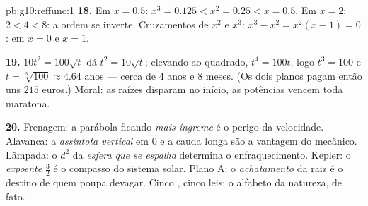 \begin{solution}{pb:g10:reffunc:1}
\textbf{18.} Em $x = 0.5$: $x^3 = 0.125 < x^2 = 0.25 < x =
0.5$. Em $x = 2$: $2 < 4 < 8$: a ordem se inverte. Cruzamentos
de $x^2$ e $x^3$: $x^3 - x^2 = x^2(x - 1) = 0$: em $x = 0$ e
$x = 1$.

\textbf{19.} $10t^2 = 100\sqrt t$ dá $t^2 = 10\sqrt t$;
elevando ao quadrado, $t^4 = 100t$, logo $t^3 = 100$ e
$t = \sqrt[3]{100} \approx 4.64$ anos --- cerca de $4$ anos e
$8$ meses. (Os dois planos pagam então uns $215$ euros.) Moral:
as raízes disparam no início, as potências vencem toda
maratona.

\textbf{20.} Frenagem: a parábola ficando \emph{mais íngreme} é
o perigo da velocidade. Alavanca: a \emph{assíntota vertical}
em $0$ e a cauda longa são a vantagem do mecânico. Lâmpada: o
$d^2$ da \emph{esfera que se espalha} determina o
enfraquecimento. Kepler: o \emph{expoente} $\frac32$ é o
compasso do sistema solar. Plano A: o \emph{achatamento} da
raiz é o destino de quem poupa devagar. Cinco , cinco
leis: o alfabeto da natureza, de fato.
\end{solution}
